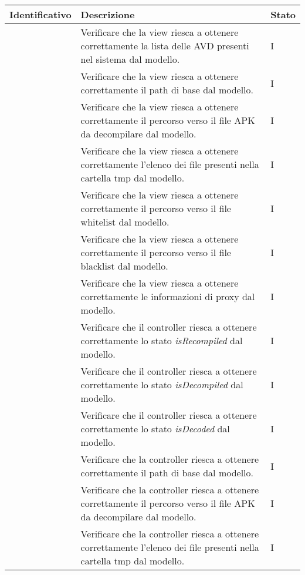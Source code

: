 \begin{center}
    \begin{longtable}{ |C{3cm} | C{8.5cm}| C{1.5cm} |}
        \hline
        \textbf{Identificativo} &
        \textbf{Descrizione} &
        \textbf{Stato} \\\hline
         &Verificare che la view riesca a ottenere correttamente la lista delle AVD presenti nel sistema dal modello. & I \\\hline
         &Verificare che la view riesca a ottenere correttamente il path di base dal modello.& I \\\hline
         &Verificare che la view riesca a ottenere correttamente il percorso verso il file APK da decompilare dal modello.& I \\\hline
         &Verificare che la view riesca a ottenere correttamente l'elenco dei file presenti nella cartella tmp dal modello.& I \\\hline
         &Verificare che la view riesca a ottenere correttamente il percorso verso il file whitelist dal modello.& I \\\hline
         &Verificare che la view riesca a ottenere correttamente il percorso verso il file blacklist dal modello.& I \\\hline
         &Verificare che la view riesca a ottenere correttamente le informazioni di proxy dal modello.& I \\\hline
         &Verificare che il controller riesca a ottenere correttamente lo stato \textit{isRecompiled} dal modello.& I \\\hline
         &Verificare che il controller riesca a ottenere correttamente lo stato \textit{isDecompiled} dal modello.& I \\\hline
         &Verificare che il controller riesca a ottenere correttamente lo stato \textit{isDecoded} dal modello.& I \\\hline
         &Verificare che la controller riesca a ottenere correttamente il path di base dal modello.& I \\\hline
         &Verificare che la controller riesca a ottenere correttamente il percorso verso il file APK da decompilare dal modello.& I \\\hline
         &Verificare che la controller riesca a ottenere correttamente l'elenco dei file presenti nella cartella tmp dal modello.& I \\\hline

\end{longtable}
\end{center}
